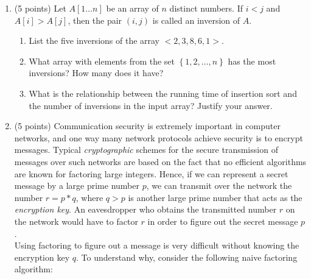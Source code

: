 \documentclass[12pt]{report}
\begin{document}
\maketitle

\begin{enumerate}[label=\arabic*.]
    \item (5 points) Let $A[1 \dots n]$ be an array of $n$ distinct numbers. If $i < j$ and $A[i] > A[j]$, then the pair $(i, j)$ is called an inversion of $A$.\label{prb:1}
	\begin{enumerate}[label=\arabic{enumi}\alph*)]
	    \item List the five inversions of the array $<2, 3, 8, 6, 1>$.
		\item What array with elements from the set $\left\{1, 2, \dots, n\right\}$ has the most inversions? How many does it have?
		\item What is the relationship between the running time of insertion sort and the number of inversions in the input array? Justify your answer.
	\end{enumerate}
	\item (5 points) Communication security is extremely important in computer networks, and one way many network protocols achieve security is to encrypt messages. Typical \emph{cryptographic} schemes for the secure transmission of messages over such networks are based on the fact that no efficient algorithms are known for factoring large integers. Hence, if we can represent a secret message by a large prime number $p$, we can transmit over the network the number $r=p*q$, where $q>p$ is another large prime number that acts as the \emph{encryption key}. An eavesdropper who obtains the transmitted number $r$ on the network would have to factor $r$ in order to figure out the secret message $p$.\\

	Using factoring to figure out a message is very difficult without knowing the encryption key $q$. To understand why, consider the following naive factoring algorithm:


\end{enumerate}
\end{document}

